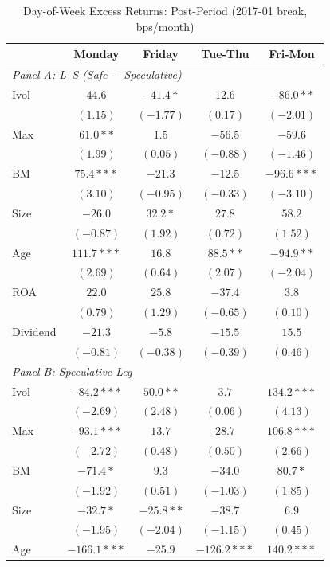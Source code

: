\begin{table}[htbp]
\centering
\caption{Day-of-Week Excess Returns: Post-Period (2017-01 break, bps/month)}
\label{tab:split_201701_post}
\footnotesize
\begin{tabular}{l c c c c}
\toprule
 & Monday & Friday & Tue-Thu & Fri-Mon \\
\midrule
\multicolumn{5}{l}{\textit{Panel A: L--S (Safe $-$ Speculative)}} \\
Ivol & $44.6$ & $-41.4*$ & $12.6$ & $-86.0**$ \\
 & $(1.15)$ & $(-1.77)$ & $(0.17)$ & $(-2.01)$ \\
Max & $61.0**$ & $1.5$ & $-56.5$ & $-59.6$ \\
 & $(1.99)$ & $(0.05)$ & $(-0.88)$ & $(-1.46)$ \\
BM & $75.4***$ & $-21.3$ & $-12.5$ & $-96.6***$ \\
 & $(3.10)$ & $(-0.95)$ & $(-0.33)$ & $(-3.10)$ \\
Size & $-26.0$ & $32.2*$ & $27.8$ & $58.2$ \\
 & $(-0.87)$ & $(1.92)$ & $(0.72)$ & $(1.52)$ \\
Age & $111.7***$ & $16.8$ & $88.5**$ & $-94.9**$ \\
 & $(2.69)$ & $(0.64)$ & $(2.07)$ & $(-2.04)$ \\
ROA & $22.0$ & $25.8$ & $-37.4$ & $3.8$ \\
 & $(0.79)$ & $(1.29)$ & $(-0.65)$ & $(0.10)$ \\
Dividend & $-21.3$ & $-5.8$ & $-15.5$ & $15.5$ \\
 & $(-0.81)$ & $(-0.38)$ & $(-0.39)$ & $(0.46)$ \\
\midrule
\multicolumn{5}{l}{\textit{Panel B: Speculative Leg}} \\
Ivol & $-84.2***$ & $50.0**$ & $3.7$ & $134.2***$ \\
 & $(-2.69)$ & $(2.48)$ & $(0.06)$ & $(4.13)$ \\
Max & $-93.1***$ & $13.7$ & $28.7$ & $106.8***$ \\
 & $(-2.72)$ & $(0.48)$ & $(0.50)$ & $(2.66)$ \\
BM & $-71.4*$ & $9.3$ & $-34.0$ & $80.7*$ \\
 & $(-1.92)$ & $(0.51)$ & $(-1.03)$ & $(1.85)$ \\
Size & $-32.7*$ & $-25.8**$ & $-38.7$ & $6.9$ \\
 & $(-1.95)$ & $(-2.04)$ & $(-1.15)$ & $(0.45)$ \\
Age & $-166.1***$ & $-25.9$ & $-126.2***$ & $140.2***$ \\

\end{tabular}
\end{table}
